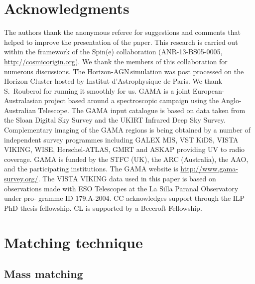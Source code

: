 \documentclass[useAMS,usenatbib]{mnras}
\newcommand{\hagn}{\mbox{{\sc \small Horizon-AGN}}}
\begin{document}
\section*{Acknowledgments}
The authors thank the anonymous referee for suggestions and comments that helped to improve the presentation of the paper.
This research is carried out within the framework of the Spin(e) collaboration (ANR-13-BS05-0005, \href{http://cosmicorigin.org}{http://cosmicorigin.org}). 
We thank the members of this collaboration for numerous discussions. 
The \hagn \,simulation was post processed on the Horizon Cluster hosted by Institut d'Astrophysique de Paris. We thank S.~Rouberol for running it smoothly for us.
GAMA is a joint European-Australasian project based around a spectroscopic campaign using the Anglo-Australian Telescope. The GAMA input catalogue is based on data taken from the Sloan Digital Sky Survey and the UKIRT Infrared Deep Sky Survey. Complementary imaging of the GAMA regions is being obtained by a number of independent survey programmes including GALEX MIS, VST KiDS, VISTA VIKING, WISE, Herschel-ATLAS, GMRT and ASKAP providing UV to radio coverage. GAMA is funded by the STFC (UK), the ARC (Australia), the AAO, and the participating institutions. The GAMA website is \href{http://www.gama-survey.org/}{http://www.gama-survey.org/}.
The VISTA VIKING data used in this paper is based on observations made with ESO Telescopes at the La Silla Paranal Observatory under pro- gramme ID 179.A-2004.
CC acknowledges support through the ILP PhD thesis fellowship. CL is supported by a Beecroft Fellowship.



\appendix


\section{Matching technique}
\label{sec:appendix_matching}

\subsection{Mass matching}
\label{subsec:appendix_mmatching}
\end{document}
